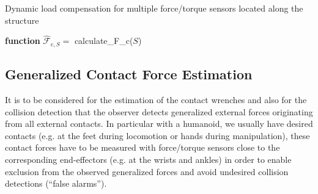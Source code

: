 \begin{algorithm}
\caption{Dynamic load compensation for multiple force/torque sensors located along the structure}
\textbf{function} $\hat{\bm{\mathcal{F}}}_{\mathrm{c},S} =$ calculate\_F\_c($S$)\\
\label{alg:comp}
\end{algorithm}

\subsection{Generalized Contact Force Estimation}

It is to be considered for the estimation of the contact wrenches and also for the collision detection that the observer detects generalized external forces originating from all external contacts.
In particular with a humanoid, we usually have desired contacts (e.g. at the feet during locomotion or hands during manipulation), these contact forces have to be measured with force/torque sensors close to the corresponding end-effectors (e.g. at the wrists and ankles) in order to enable exclusion from the observed generalized forces and avoid undesired collision detections (``false alarms'').

